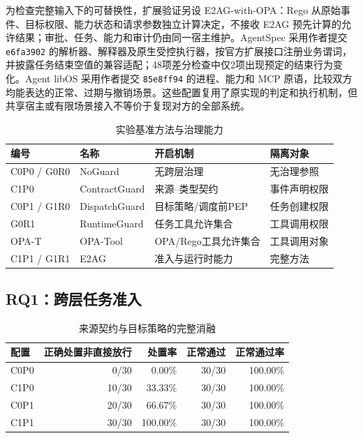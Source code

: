 为检查完整输入下的可替换性，扩展验证另设 E2AG-with-OPA：Rego 从原始事件、目标权限、能力状态和请求参数独立计算决定，不接收 E2AG 预先计算的允许结果；审批、任务、能力和审计仍由同一宿主维护。AgentSpec 采用作者提交 \texttt{e6fa3902} 的解析器、解释器及原生受控执行器，按官方扩展接口注册业务谓词，并披露任务结束空值的兼容适配；48项差分检查中仅2项出现预定的结束行为变化。Agent libOS 采用作者提交 \texttt{85e8ff94} 的进程、能力和 MCP 原语，比较双方均能表达的正常、过期与撤销场景。这些配置复用了原实现的判定和执行机制，但共享宿主或有限场景接入不等价于复现对方的全部系统。

\begin{table}[htbp]
\centering
\caption{实验基准方法与治理能力}
\label{tab:baselines-v11}
\small
\begin{tabular}{llll}
\toprule
编号 & 名称 & 开启机制 & 隔离对象 \\
\midrule
C0P0 / G0R0 & NoGuard & 无跨层治理 & 无治理参照 \\
C1P0 & ContractGuard & 来源--类型契约 & 事件声明权限 \\
C0P1 / G1R0 & DispatchGuard & 目标策略/调度前PEP & 任务创建权限 \\
G0R1 & RuntimeGuard & 任务工具允许集合 & 工具调用权限 \\
OPA-T & OPA-Tool & OPA/Rego工具允许集合 & 工具调用对象 \\
C1P1 / G1R1 & E2AG & 准入与运行时能力 & 完整方法 \\
\bottomrule
\end{tabular}
\end{table}

\subsection{RQ1：跨层任务准入}

\begin{table}[htbp]
\centering
\caption{来源契约与目标策略的完整消融}
\label{tab:rq1-v11}
\small
\begin{tabular}{lrrrr}
\toprule
配置 & 正确处置非直接放行 & 处置率 & 正常通过 & 正常通过率 \\
\midrule
C0P0 & 0/30 & 0.00\% & 30/30 & 100.00\% \\
C1P0 & 10/30 & 33.33\% & 30/30 & 100.00\% \\
C0P1 & 20/30 & 66.67\% & 30/30 & 100.00\% \\
C1P1 & 30/30 & 100.00\% & 30/30 & 100.00\% \\
\bottomrule
\end{tabular}
\end{table}


